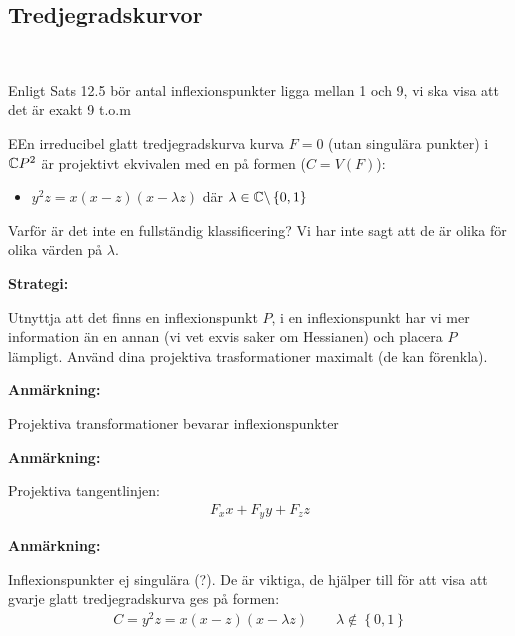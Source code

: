 \subsection{Tredjegradskurvor}\hfill\\\par
\noindent Enligt Sats 12.5 bör antal inflexionspunkter ligga mellan 1 och 9, vi ska visa att det är exakt 9 t.o.m
\par\bigskip
\begin{theo}
  EEn irreducibel glatt tredjegradskurva kurva $F =0$ (utan singulära punkter) i $\mathbb{C} P^2$ är projektivt ekvivalen med en på formen ($C = V(F)$):
  \begin{itemize}
    \item $y^2z = x(x-z)(x-\lambda z)$ där $\lambda\in\mathbb{C}\backslash\left\{0,1\right\}$
  \end{itemize}
\end{theo}
\par\bigskip
\noindent Varför är det inte en fullständig klassificering? Vi har inte sagt att de är olika för olika värden på $\lambda$.
\par\bigskip
\noindent\textbf{Strategi:}\par
\noindent Utnyttja att det finns en inflexionspunkt $P$, i en inflexionspunkt har vi mer information än en annan (vi vet exvis saker om Hessianen) och placera $P$ lämpligt. Använd dina projektiva trasformationer maximalt (de kan förenkla). 
\par\bigskip
\noindent\textbf{Anmärkning:}\par
\noindent Projektiva transformationer bevarar inflexionspunkter
\par\bigskip
\noindent\textbf{Anmärkning:}\par
\noindent Projektiva tangentlinjen:
\begin{equation*}
  \begin{gathered}
    F_xx+F_yy+F_zz
  \end{gathered}
\end{equation*}
\par\bigskip
\noindent\textbf{Anmärkning:}\par
\noindent Inflexionspunkter ej singulära (?). De är viktiga, de hjälper till för att visa att gvarje glatt tredjegradskurva ges på formen:
\begin{equation*}
  \begin{gathered}
    C = y^2z = x(x-z)(x-\lambda z)\qquad\lambda\notin\left\{0,1\right\}
  \end{gathered}
\end{equation*}
